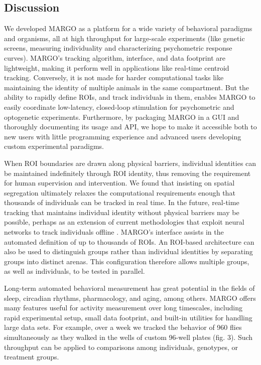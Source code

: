 \documentclass[10pt]{article}
\begin{document}
\begin{multicols}{2}
\section*{Discussion}

We developed MARGO as a platform for a wide variety of behavioral paradigms and organisms, all at high throughput for large-scale experiments (like genetic screens, measuring individuality and characterizing psychometric response curves). MARGO's tracking algorithm, interface, and data footprint are lightweight, making it perform well in applications like real-time centroid tracking. Conversely, it is not made for harder computational tasks like maintaining the identity of multiple animals in the same compartment. But the ability to rapidly define ROIs, and track individuals in them, enables MARGO to easily coordinate low-latency, closed-loop stimulation for psychometric and optogenetic experiments. Furthermore, by packaging MARGO in a GUI and thoroughly documenting its usage and API, we hope to make it accessible both to new users with little programming experience and advanced users developing custom experimental paradigms.

When ROI boundaries are drawn along physical barriers, individual identities can be maintained indefinitely through ROI identity, thus removing the requirement for human supervision and intervention. We found that insisting on spatial segregation ultimately relaxes the computational requirements enough that thousands of individuals can be tracked in real time. In the future, real-time tracking that maintains individual identity without physical barriers may be possible, perhaps as an extension of current methodologies that exploit neural networks to track individuals offline \citep{romero-ferrero_2019,schneider_2018}. MARGO's interface assists in the automated definition of up to thousands of ROIs. An ROI-based architecture can also be used to distinguish groups rather than individual identities by separating groups into distinct arenas. This configuration therefore allows multiple groups, as well as individuals, to be tested in parallel.

Long-term automated behavioral measurement has great potential in the fields of sleep, circadian rhythms, pharmacology, and aging, among others. MARGO offers many features useful for activity measurement over long timescales, including rapid experimental setup, small data footprint, and built-in utilities for handling large data sets. For example, over a week we tracked the behavior of 960 flies simultaneously as they walked in the wells of custom 96-well plates (fig. 3). Such throughput can be applied to comparisons among individuals, genotypes, or treatment groups. 


\end{multicols}
\end{document}
